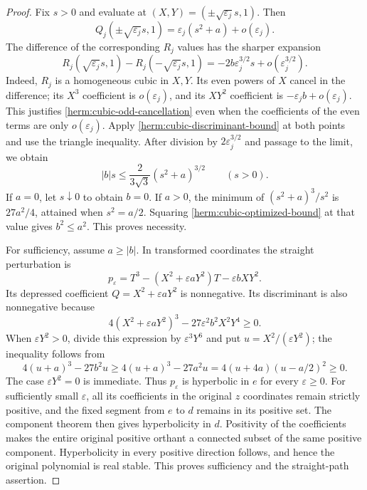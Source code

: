 \documentclass[reqno]{amsart}
\theoremstyle{definition}
\theoremstyle{remark}
\begin{document}
\begin{proof}
Fix $s>0$ and evaluate at $(X,Y)=(\pm\sqrt{\varepsilon_j}s,1)$.
Then
\[
 Q_j(\pm\sqrt{\varepsilon_j}s,1)
       =\varepsilon_j(s^2+a)+o(\varepsilon_j).
\]
The difference of the corresponding $R_j$ values has the sharper
expansion
\begin{equation}
 R_j(\sqrt{\varepsilon_j}s,1)
       -R_j(-\sqrt{\varepsilon_j}s,1)
       =-2b\varepsilon_j^{3/2}s+o(\varepsilon_j^{3/2}).
 \label{herm:cubic-odd-cancellation}
\end{equation}
Indeed, $R_j$ is a homogeneous cubic in $X,Y$.  Its even powers of $X$
cancel in the difference; its $X^3$ coefficient is $o(\varepsilon_j)$,
and its $XY^2$ coefficient is
$-\varepsilon_jb+o(\varepsilon_j)$.  This justifies
\eqref{herm:cubic-odd-cancellation} even when the coefficients of the
even terms are only $o(\varepsilon_j)$.
Apply \eqref{herm:cubic-discriminant-bound} at both points and use the
triangle inequality.  After division by $2\varepsilon_j^{3/2}$ and
passage to the limit, we obtain
\begin{equation}
 |b|s\leq\frac{2}{3\sqrt3}(s^2+a)^{3/2}\qquad(s>0).
 \label{herm:cubic-optimized-bound}
\end{equation}
If $a=0$, let $s\downarrow0$ to obtain $b=0$.  If $a>0$, the minimum
of $(s^2+a)^3/s^2$ is $27a^2/4$, attained when $s^2=a/2$.
Squaring \eqref{herm:cubic-optimized-bound} at that value gives
$b^2\leq a^2$.  This proves necessity.

For sufficiency, assume $a\geq|b|$.  In transformed coordinates the
straight perturbation is
\[
 p_\varepsilon
       =T^3-(X^2+\varepsilon aY^2)T-\varepsilon bXY^2.
\]
Its depressed coefficient $Q=X^2+\varepsilon aY^2$ is nonnegative.
Its discriminant is also nonnegative because
\[
 4(X^2+\varepsilon aY^2)^3
       -27\varepsilon^2b^2X^2Y^4\geq0.
\]
When $\varepsilon Y^2>0$, divide this expression by
$\varepsilon^3Y^6$ and put $u=X^2/(\varepsilon Y^2)$; the inequality
follows from
\[
 4(u+a)^3-27b^2u
 \geq4(u+a)^3-27a^2u
       =4(u+4a)(u-a/2)^2\geq0.
\]
The case $\varepsilon Y^2=0$ is immediate.  Thus $p_\varepsilon$ is
hyperbolic in $e$ for every $\varepsilon\geq0$.
For sufficiently small $\varepsilon$, all its coefficients in the
original $z$ coordinates remain strictly positive, and the fixed segment
from $e$ to $d$ remains in its positive set.  The component theorem
then gives hyperbolicity in $d$.  Positivity of the coefficients makes
the entire original positive orthant a connected subset of the same
positive component.  Hyperbolicity in every positive direction follows,
and hence the original polynomial is real stable.  This proves
sufficiency and the straight-path assertion.
\end{proof}
\end{document}
